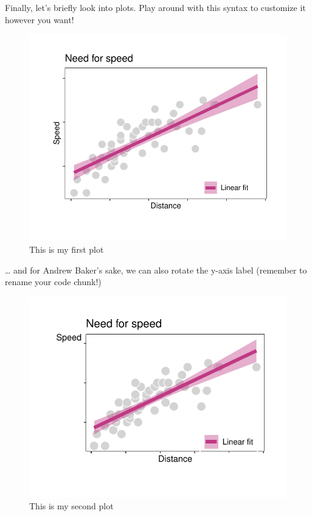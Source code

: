 \documentclass[
]{article}
\begin{document}
Finally, let's briefly look into plots. Play around with this syntax to
customize it however you want!

\begin{figure}[H]

{\centering \includegraphics[width=0.7\linewidth]{Rmarkdown_template_files/figure-latex/speed1-1} 

}

\caption{This is my first plot}\label{fig:speed1}
\end{figure}

\ldots{} and for Andrew Baker's sake, we can also rotate the y-axis
label (remember to rename your code chunk!)

\begin{figure}[H]

{\centering \includegraphics{Rmarkdown_template_files/figure-latex/speed2-1} 

}

\caption{This is my second plot}\label{fig:speed2}
\end{figure}
\end{document}
